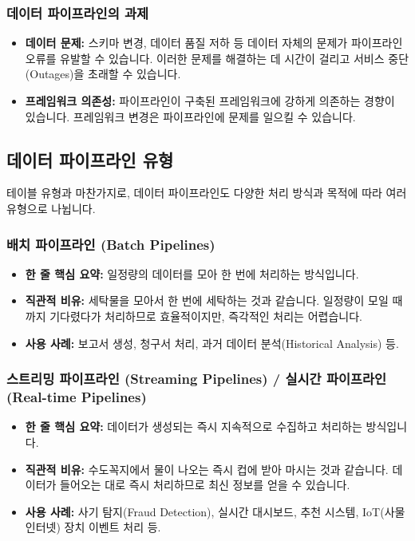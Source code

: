 \documentclass[11pt,a4paper]{article}
\begin{document}
\subsubsection{데이터 파이프라인의 과제}
\begin{itemize}
    \item \textbf{데이터 문제:} 스키마 변경, 데이터 품질 저하 등 데이터 자체의 문제가 파이프라인 오류를 유발할 수 있습니다. 이러한 문제를 해결하는 데 시간이 걸리고 서비스 중단(Outages)을 초래할 수 있습니다.
    \item \textbf{프레임워크 의존성:} 파이프라인이 구축된 프레임워크에 강하게 의존하는 경향이 있습니다. 프레임워크 변경은 파이프라인에 문제를 일으킬 수 있습니다.
\end{itemize}

\subsection{데이터 파이프라인 유형}

테이블 유형과 마찬가지로, 데이터 파이프라인도 다양한 처리 방식과 목적에 따라 여러 유형으로 나뉩니다.

\subsubsection{배치 파이프라인 (Batch Pipelines)}
\begin{itemize}
    \item \textbf{한 줄 핵심 요약:} 일정량의 데이터를 모아 한 번에 처리하는 방식입니다.
    \item \textbf{직관적 비유:} 세탁물을 모아서 한 번에 세탁하는 것과 같습니다. 일정량이 모일 때까지 기다렸다가 처리하므로 효율적이지만, 즉각적인 처리는 어렵습니다.
    \item \textbf{사용 사례:} 보고서 생성, 청구서 처리, 과거 데이터 분석(Historical Analysis) 등.
\end{itemize}

\subsubsection{스트리밍 파이프라인 (Streaming Pipelines) / 실시간 파이프라인 (Real-time Pipelines)}
\begin{itemize}
    \item \textbf{한 줄 핵심 요약:} 데이터가 생성되는 즉시 지속적으로 수집하고 처리하는 방식입니다.
    \item \textbf{직관적 비유:} 수도꼭지에서 물이 나오는 즉시 컵에 받아 마시는 것과 같습니다. 데이터가 들어오는 대로 즉시 처리하므로 최신 정보를 얻을 수 있습니다.
    \item \textbf{사용 사례:} 사기 탐지(Fraud Detection), 실시간 대시보드, 추천 시스템, IoT(사물 인터넷) 장치 이벤트 처리 등.
\end{itemize}
\end{document}
